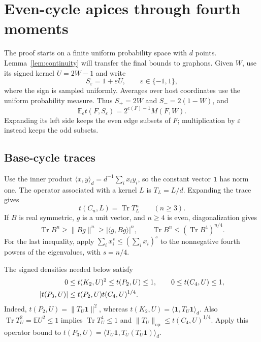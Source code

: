 \documentclass[11pt,a4paper]{article}
\theoremstyle{remark}
\numberwithin{equation}{section}
\DeclareMathOperator{\Tr}{Tr}
\newcommand{\E}{\mathbb E}
\newcommand{\one}{\mathbf 1}
\newcommand{\ip}[2]{\langle #1,#2\rangle}
\newcommand{\op}{\mathrm{op}}
\begin{document}
\section{Even-cycle apices through fourth moments}\label{sec:cycles}

The proof starts on a finite uniform probability space with $d$
points. Lemma~\ref{lem:continuity} will transfer the final bounds
to graphons. Given $W$, use its signed kernel $U=2W-1$ and write
\[
 S_\varepsilon=1+\varepsilon U,\qquad \varepsilon\in\{-1,1\},
\]
where the sign is sampled uniformly. Averages over host coordinates
use the uniform probability measure. Thus $S_+=2W$ and
$S_-=2(1-W)$, and
\begin{equation}\label{eq:signed-average}
 \E_\varepsilon t(F,S_\varepsilon)=2^{e(F)-1}M(F,W).
\end{equation}
Expanding its left side keeps the even edge subsets of $F$;
multiplication by $\varepsilon$ instead keeps the odd subsets.

\subsection{Base-cycle traces}

Use the inner product $\ip xy_d=d^{-1}\sum_i x_i y_i$, so the
constant vector $\one$ has norm one. The operator associated with
a kernel $L$ is $T_L=L/d$. Expanding the trace gives
\begin{equation}\label{eq:cycle-trace}
 t(C_n,L)=\Tr T_L^n\qquad(n\geq3).
\end{equation}
If $B$ is real symmetric, $g$ is
a unit vector, and $n\geq4$ is even, diagonalization gives
\begin{equation}\label{eq:spectral}
 \Tr B^n\geq\|Bg\|^n\geq|\ip g{Bg}|^n,
 \qquad \Tr B^n\leq(\Tr B^4)^{n/4}.
\end{equation}
For the last inequality, apply
$\sum_i x_i^s\leq(\sum_i x_i)^s$ to the nonnegative fourth
powers of the eigenvalues, with $s=n/4$.

The signed densities needed below satisfy
\begin{align}
 0&\leq t(K_2,U)^2\leq t(P_2,U)\leq1,
 \qquad 0\leq t(C_4,U)\leq1,\notag\\
 |t(P_3,U)|&\leq t(P_2,U)t(C_4,U)^{1/4}.
 \label{eq:scalar-bounds}
\end{align}
Indeed, $t(P_2,U)=\|T_U\one\|^2$, whereas
$t(K_2,U)=\ip\one{T_U\one}_d$.
Also $\Tr T_U^2=\E U^2\leq1$ implies
$\Tr T_U^4\leq1$ and
$\|T_U\|_\op\leq t(C_4,U)^{1/4}$.
Apply this operator bound to
$t(P_3,U)=\ip{T_U\one}{T_U(T_U\one)}_d$.
\end{document}
